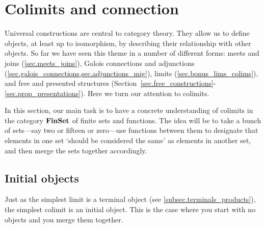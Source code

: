 \documentclass[7Sketches]{subfiles}
\begin{document}


\section{Colimits and connection}%
\label{sec.colims_connection}

Universal constructions are central to category theory. They allow us to define
objects, at least up to isomorphism, by describing their relationship with other
objects. So far we have seen this theme in a number of different forms: meets and joins (\cref{sec.meets_joins}), Galois
connections and adjunctions (\cref{sec.galois_connections,sec.adjunctions_mig}),
limits (\cref{sec.bonus_lims_colims}), and free and presented structures
(Section~\ref{sec.free_constructions}-\ref{sec.prop_presentations}).  Here we turn our attention to colimits.
%

In this section, our main task is to have a concrete understanding of colimits
in the category $\mathbf{FinSet}$ of finite sets and functions. The idea will be to take
a bunch of sets---say two or fifteen or zero---use functions between them to
designate that elements in one set `should be considered the same' as elements
in another set, and then merge the sets together accordingly.

\subsection{Initial objects} %
%

Just as the simplest limit is a terminal object (see
\cref{subsec.terminals_products}), the simplest colimit is an initial object.
This is the case where you start with no objects and you merge them together.
\end{document}
